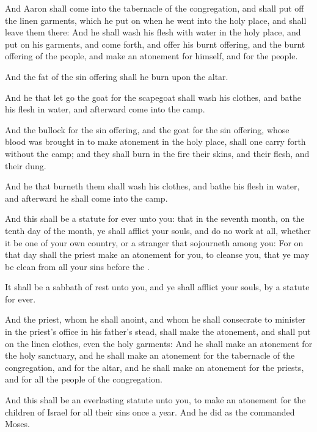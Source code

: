 \verse And Aaron shall come into the tabernacle of the congregation, and shall put off the linen garments, which he put on when he went into the holy place, and shall leave them there: \verse And he shall wash his flesh with water in the holy place, and put on his garments, and come forth, and offer his burnt offering, and the burnt offering of the people, and make an atonement for himself, and for the people.

\verse And the fat of the sin offering shall he burn upon the altar.

\verse And he that let go the goat for the scapegoat shall wash his clothes, and bathe his flesh in water, and afterward come into the camp.

\verse And the bullock for the sin offering, and the goat for the sin offering, whose blood was brought in to make atonement in the holy place, shall one carry forth without the camp; and they shall burn in the fire their skins, and their flesh, and their dung.

\verse And he that burneth them shall wash his clothes, and bathe his flesh in water, and afterward he shall come into the camp.

\verse And this shall be a statute for ever unto you: that in the seventh month, on the tenth day of the month, ye shall afflict your souls, and do no work at all, whether it be one of your own country, or a stranger that sojourneth among you: \verse For on that day shall the priest make an atonement for you, to cleanse you, that ye may be clean from all your sins before the \LORD.

\verse It shall be a sabbath of rest unto you, and ye shall afflict your souls, by a statute for ever.

\verse And the priest, whom he shall anoint, and whom he shall consecrate to minister in the priest's office in his father's stead, shall make the atonement, and shall put on the linen clothes, even the holy garments: \verse And he shall make an atonement for the holy sanctuary, and he shall make an atonement for the tabernacle of the congregation, and for the altar, and he shall make an atonement for the priests, and for all the people of the congregation.

\verse And this shall be an everlasting statute unto you, to make an atonement for the children of Israel for all their sins once a year.  And he did as the \LORD commanded Moses.

